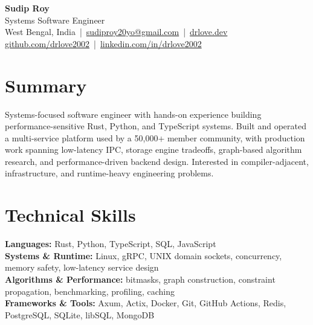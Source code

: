 \documentclass[10pt,a4paper]{article}
\newcommand{\resumeheader}[1]{\begin{center}#1\end{center}}
\begin{document}
\resumeheader{
  {\LARGE \textbf{Sudip Roy}}\\
  Systems Software Engineer\\
  West Bengal, India \,|\, \href{mailto:sudiproy20yo@gmail.com}{sudiproy20yo@gmail.com} \,|\, \href{https://drlove.dev}{drlove.dev}\\
  \href{https://github.com/drlove2002}{github.com/drlove2002} \,|\, \href{https://linkedin.com/in/drlove2002}{linkedin.com/in/drlove2002}
}

\section*{Summary}
Systems-focused software engineer with hands-on experience building performance-sensitive Rust, Python, and TypeScript systems. Built and operated a multi-service platform used by a 50{,}000+ member community, with production work spanning low-latency IPC, storage engine tradeoffs, graph-based algorithm research, and performance-driven backend design. Interested in compiler-adjacent, infrastructure, and runtime-heavy engineering problems.

\section*{Technical Skills}
\textbf{Languages:} Rust, Python, TypeScript, SQL, JavaScript\\
\textbf{Systems \& Runtime:} Linux, gRPC, UNIX domain sockets, concurrency, memory safety, low-latency service design\\
\textbf{Algorithms \& Performance:} bitmasks, graph construction, constraint propagation, benchmarking, profiling, caching\\
\textbf{Frameworks \& Tools:} Axum, Actix, Docker, Git, GitHub Actions, Redis, PostgreSQL, SQLite, libSQL, MongoDB
\end{document}
